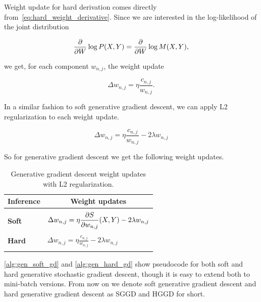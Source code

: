 Weight update for hard derivation comes directly from~\autoref{eq:hard_weight_derivative}. Since we
are interested in the log-likelihood of the joint distribution

\begin{equation*}
  \frac{\partial}{\partial W}\log P(X,Y)=\frac{\partial}{\partial W}\log M(X,Y),
\end{equation*}

we get, for each component $w_{n,j}$, the weight update

\begin{equation*}
  \Delta w_{n,j}=\eta\frac{c_{n,j}}{w_{n,j}}.
\end{equation*}

In a similar fashion to soft generative gradient descent, we can apply L2 regularization to each
weight update.

\begin{equation}
  \Delta w_{n,j}=\eta\frac{c_{n,j}}{w_{n,j}}-2\lambda w_{n,j}
\end{equation}

So for generative gradient descent we get the following weight updates.

\begin{table}[h]
  \centering
  \begin{tabular}{l|l}
    \hline
    \multicolumn{1}{c}{\bfseries Inference} & \multicolumn{1}{c}{\bfseries Weight updates}\\
    \hline & \\
    \textbf{Soft} & \(\displaystyle \Delta w_{n,j}=\eta\frac{\partial S}{\partial w_{n,j}}(X, Y)-2\lambda w_{n,j} \) \\
    & \\
    \textbf{Hard} & \(\displaystyle \Delta w_{n,j}=\eta\frac{c_{n,j}}{w_{n,j}}-2\lambda w_{n,j} \) \\
    & \\
    \hline
  \end{tabular}
  \caption{Generative gradient descent weight updates with L2
    regularization.\label{tab:generative_weight_updates}}
\end{table}

\autoref{alg:gen_soft_gd} and \autoref{alg:gen_hard_gd} show pseudocode for both soft and hard
generative stochastic gradient descent, though it is easy to extend both to mini-batch versions.
From now on we denote soft generative gradient descent and hard generative gradient descent as SGGD
and HGGD for short.

